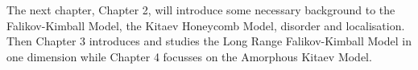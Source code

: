 The next chapter, Chapter 2, will introduce some necessary background to the Falikov-Kimball Model, the Kitaev Honeycomb Model, disorder and localisation. Then Chapter 3 introduces and studies the Long Range Falikov-Kimball Model in one dimension while Chapter 4 focusses on the Amorphous Kitaev Model.

\begin{Shaded}
\begin{Highlighting}[]

\end{Highlighting}
\end{Shaded}
